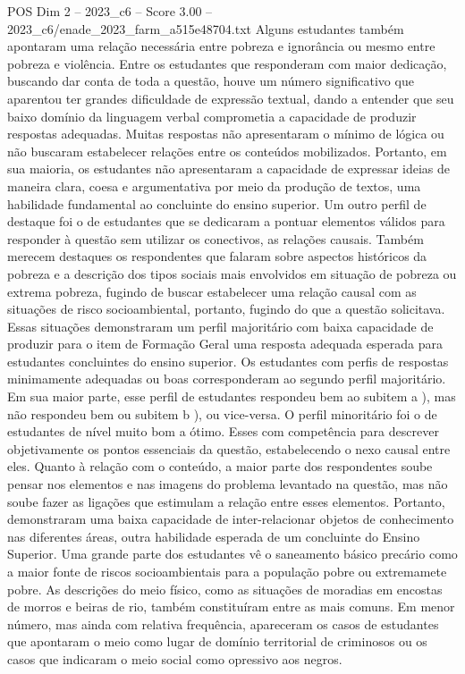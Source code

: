 \begin{textsample}{POS Dim 2 – 2023\_c6 – Score 3.00 – 2023\_c6/enade\_2023\_farm\_a515e48704.txt}
Alguns estudantes também apontaram uma relação necessária entre pobreza e ignorância ou mesmo entre pobreza e violência.
Entre os estudantes que responderam com maior dedicação, buscando dar conta de toda a questão, houve um número significativo que aparentou ter grandes dificuldade de expressão textual, dando a entender que seu baixo domínio da linguagem verbal comprometia a capacidade de produzir respostas adequadas.
Muitas respostas não apresentaram o mínimo de lógica ou não buscaram estabelecer relações entre os conteúdos mobilizados.
Portanto, em sua maioria, os estudantes não apresentaram a capacidade de expressar ideias de maneira clara, coesa e argumentativa por meio da produção de textos, uma habilidade fundamental ao concluinte do ensino superior.
Um outro perfil de destaque foi o de estudantes que se dedicaram a pontuar elementos válidos para responder à questão sem utilizar os conectivos, as relações causais.
Também merecem destaques os respondentes que falaram sobre aspectos históricos da pobreza e a descrição dos tipos sociais mais envolvidos em situação de pobreza ou extrema pobreza, fugindo de buscar estabelecer uma relação causal com as situações de risco socioambiental, portanto, fugindo do que a questão solicitava.
Essas situações demonstraram um perfil majoritário com baixa capacidade de produzir para o item de Formação Geral uma resposta adequada esperada para estudantes concluintes do ensino superior.
Os estudantes com perfis de respostas minimamente adequadas ou boas corresponderam ao segundo perfil majoritário.
Em sua maior parte, esse perfil de estudantes respondeu bem ao subitem a ), mas não respondeu bem ou subitem b ), ou vice-versa.
O perfil minoritário foi o de estudantes de nível muito bom a ótimo.
Esses com competência para descrever objetivamente os pontos essenciais da questão, estabelecendo o nexo causal entre eles.
Quanto à relação com o conteúdo, a maior parte dos respondentes soube pensar nos elementos e nas imagens do problema levantado na questão, mas não soube fazer as ligações que estimulam a relação entre esses elementos.
Portanto, demonstraram uma baixa capacidade de inter-relacionar objetos de conhecimento nas diferentes áreas, outra habilidade esperada de um concluinte do Ensino Superior.
Uma grande parte dos estudantes vê o saneamento básico precário como a maior fonte de riscos socioambientais para a população pobre ou extremamete pobre.
As descrições do meio físico, como as situações de moradias em encostas de morros e beiras de rio, também constituíram entre as mais comuns.
Em menor número, mas ainda com relativa frequência, apareceram os casos de estudantes que apontaram o meio como lugar de domínio territorial de criminosos ou os casos que indicaram o meio social como opressivo aos negros.

\end{textsample}
